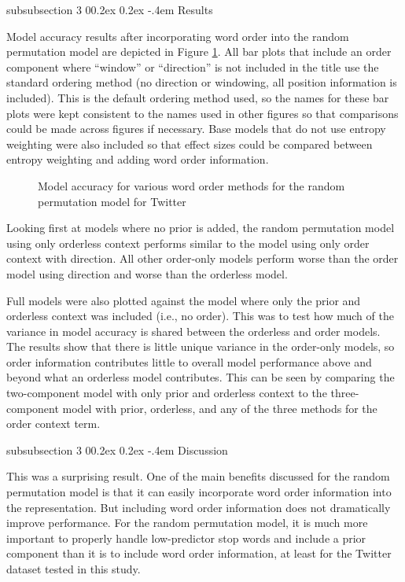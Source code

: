 \documentclass[man,donotrepeattitle]{apa6}
\makeatletter
\renewcommand{\subsubsection}{%
  \@startsection
  {subsubsection}%
  {3}%
  {\parindent}%
  {0\baselineskip \@plus 0.2ex \@minus 0.2ex}%
  {-.4em}%
  {\normalfont\normalsize\bfseries\addperi}}
\makeatother
\begin{document}
\subsubsection{Results}

Model accuracy results after incorporating word order into the random permutation model are depicted in Figure \ref{figContextOrder}.
All bar plots that include an order component where ``window'' or ``direction'' is not included in the title use the standard ordering method (no direction or windowing, all position information is included).
This is the default ordering method used, so the names for these bar plots were kept consistent to the names used in other figures so that comparisons could be made across figures if necessary.
Base models that do not use entropy weighting were also included so that effect sizes could be compared between entropy weighting and adding word order information.

\begin{figure}[!htbp]
  \caption{Model accuracy for various word order methods for the random permutation model for Twitter}
  \label{figContextOrder}
\end{figure}

Looking first at models where no prior is added, the random permutation model using only orderless context performs similar to the model using only order context with direction.
All other order-only models perform worse than the order model using direction and worse than the orderless model.

Full models were also plotted against the model where only the prior and orderless context was included (i.e., no order).
This was to test how much of the variance in model accuracy is shared between the orderless and order models.
The results show that there is little unique variance in the order-only models, so order information contributes little to overall model performance above and beyond what an orderless model contributes.
This can be seen by comparing the two-component model with only prior and orderless context to the three-component model with prior, orderless, and any of the three methods for the order context term.

\subsubsection{Discussion}

This was a surprising result.
One of the main benefits discussed for the random permutation model is that it can easily incorporate word order information into the representation.
But including word order information does not dramatically improve performance. 
For the random permutation model, it is much more important to properly handle low-predictor stop words and include a prior component than it is to include word order information,
at least for the Twitter dataset tested in this study.
\end{document}
